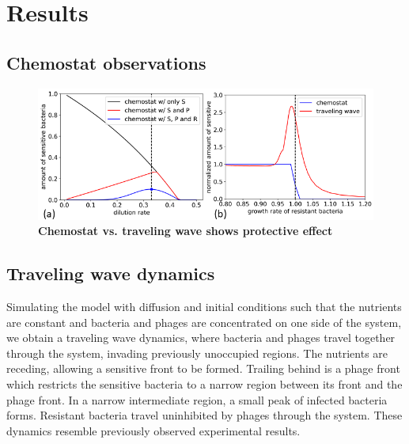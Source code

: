 \chapter{Results}
\label{chap:phages_results}

\section{Chemostat observations}

\begin{figure}
\centering
\includegraphics[width=\linewidth]{graphics/2025_09_26_droplets_fig2.png}
\caption{\textbf{Chemostat vs. traveling wave shows protective effect}}
\label{fig:results_chemostat_traveling_wave}
\end{figure}

\section{Traveling wave dynamics}
Simulating the model with diffusion and initial conditions such that the nutrients are constant and bacteria and phages are concentrated on one side of the system, we obtain a traveling wave dynamics, where bacteria and phages travel together through the system, invading previously unoccupied regions. The nutrients are receding, allowing a sensitive front to be formed. Trailing behind is a phage front which restricts the sensitive bacteria to a narrow region between its front and the phage front. In a narrow intermediate region, a small peak of infected bacteria forms. Resistant bacteria travel uninhibited by phages through the system. These dynamics resemble previously observed experimental results. 
